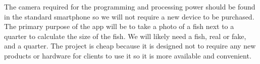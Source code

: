 The camera required for the programming and processing power should be found in the standard smartphone so we will not require a new device to be purchased. The primary purpose of the app will be to take a photo of a fish next to a quarter to calculate the size of the fish. We will likely need a fish, real or fake, and a quarter. The project is cheap because it is designed not to require any new products or hardware for clients to use it so it is more available and convenient.